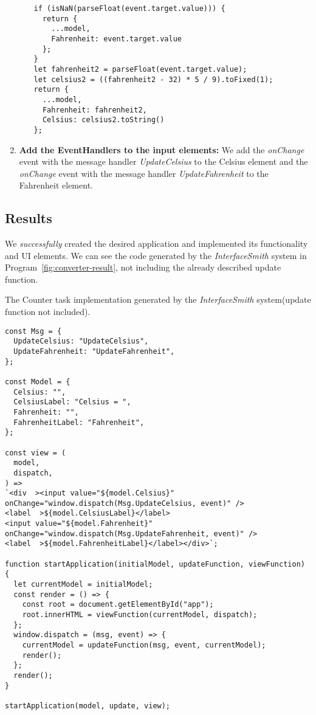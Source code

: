 \begin{enumerate}
\begin{itemize}
\begin{listing}[htbp]
			            \begin{lstlisting}
if (isNaN(parseFloat(event.target.value))) {
  return {
    ...model,
    Fahrenheit: event.target.value
  };
}
let fahrenheit2 = parseFloat(event.target.value);
let celsius2 = ((fahrenheit2 - 32) * 5 / 9).toFixed(1);
return {
  ...model,
  Fahrenheit: fahrenheit2,
  Celsius: celsius2.toString()
};            \end{lstlisting}

		            \end{listing}
	      \end{itemize}

	\item \textbf{Add the EventHandlers to the input elements:} We add the \emph{onChange} event with the message handler \emph{UpdateCelsius} to the Celsius element and the \emph{onChange} event with the message handler \emph{UpdateFahrenheit} to the Fahrenheit element.
\end{enumerate}
\medskip
\subsection{Results}
We \emph{successfully} created the desired application and implemented its functionality and UI elements.
We can see the code generated by the \emph{InterfaceSmith} system in Program~\ref{fig:converter-result}, not including the already described update function.

\begin{listing}[p]
	\caption {The Counter task implementation generated by the \emph{InterfaceSmith} system(update function not included).}
	\label{fig:converter-result}
	\begin{lstlisting}
const Msg = {
  UpdateCelsius: "UpdateCelsius",
  UpdateFahrenheit: "UpdateFahrenheit",
};

const Model = {
  Celsius: "",
  CelsiusLabel: "Celsius = ",
  Fahrenheit: "",
  FahrenheitLabel: "Fahrenheit",
};

const view = (
  model,
  dispatch,
) =>
`<div  ><input value="${model.Celsius}" onChange="window.dispatch(Msg.UpdateCelsius, event)" />
<label  >${model.CelsiusLabel}</label>
<input value="${model.Fahrenheit}" onChange="window.dispatch(Msg.UpdateFahrenheit, event)" />
<label  >${model.FahrenheitLabel}</label></div>`;

function startApplication(initialModel, updateFunction, viewFunction) {
  let currentModel = initialModel;
  const render = () => {
    const root = document.getElementById("app");
    root.innerHTML = viewFunction(currentModel, dispatch);
  };
  window.dispatch = (msg, event) => {
    currentModel = updateFunction(msg, event, currentModel);
    render();
  };
  render();
}

startApplication(model, update, view);
\end{lstlisting}
\end{listing}


